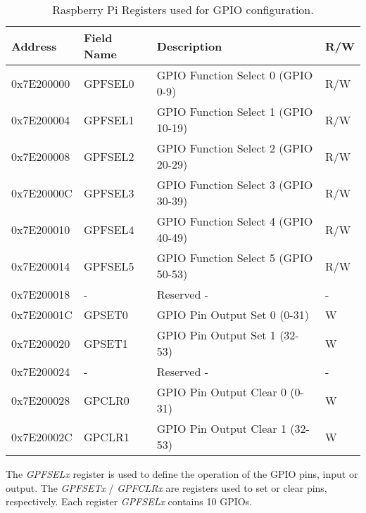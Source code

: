 \begin{table}[H]
	\centering
	\resizebox{\columnwidth}{!}
	{
		\begin{tabular}{|m{}|m{}|m{}|m{}|}
			\hline
			\textbf{Address} & \textbf{Field Name} & \textbf{Description} & \textbf{R/W}
			\\\hline\hline
			0x7E200000 & GPFSEL0 & GPIO Function Select 0 (GPIO 0-9) &  R/W
			\\\hline
			
			0x7E200004 & GPFSEL1 & GPIO Function Select 1 (GPIO 10-19) & R/W
			\\\hline
			
			0x7E200008 & GPFSEL2 & GPIO Function Select 2 (GPIO 20-29) & R/W
			\\\hline
			
			0x7E20000C & GPFSEL3 & GPIO Function Select 3 (GPIO 30-39) & R/W
			\\\hline
			
			0x7E200010 & GPFSEL4 & GPIO Function Select 4 (GPIO 40-49) & R/W
			\\\hline
			
			0x7E200014 & GPFSEL5 & GPIO Function Select 5 (GPIO 50-53) & R/W
			\\\hline
			
			0x7E200018 & - & Reserved - & -
			\\\hline
			
			0x7E20001C & GPSET0 & GPIO Pin Output Set 0 (0-31) & W
			\\\hline
			
			0x7E200020 & GPSET1 & GPIO Pin Output Set 1 (32-53) & W
			\\\hline
			
			0x7E200024 & - & Reserved - & -
			\\\hline
			
			0x7E200028 & GPCLR0 & GPIO Pin Output Clear 0 (0-31) & W
			\\\hline
			
			0x7E20002C & GPCLR1 & GPIO Pin Output Clear 1 (32-53) & W
			\\\hline			
		\end{tabular}
	}
	\caption{Raspberry Pi Registers used for GPIO configuration.}
	\label{table:gpio_reg}
\end{table}

The \textit{GPFSELx} register is used to define the operation of the GPIO pins, input or output. The \textit{GPFSETx} / \textit{GPFCLRx} are registers used to set or clear pins, respectively. Each register \textit{GPFSELx} contains 10 GPIOs.

